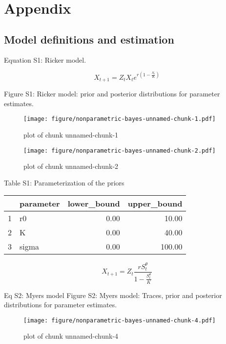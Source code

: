 \documentclass[author-year, review]{elsarticle} %
\makeatletter
\def\maxwidth{\ifdim\Gin@nat@width>\linewidth\linewidth
\else\Gin@nat@width\fi}
\let\Oldincludegraphics\includegraphics
\renewcommand{\includegraphics}[1]{\Oldincludegraphics[width=\maxwidth]{#1}}
\makeatother
\begin{document}
\section{Appendix}\label{appendix}

\subsection{Model definitions and
estimation}\label{model-definitions-and-estimation}

Equation S1: Ricker model.

\[X_{t+1} = Z_t X_t e^{r \left(1 - \frac{S_t}{K} \right) } \]

Figure S1: Ricker model: prior and posterior distributions for parameter
estimates.

\begin{figure}[htbp]
\centering
\texttt{[image: figure/nonparametric-bayes-unnamed-chunk-1.pdf]}
\caption{plot of chunk unnamed-chunk-1}
\end{figure}

\begin{figure}[htbp]
\centering
\texttt{[image: figure/nonparametric-bayes-unnamed-chunk-2.pdf]}
\caption{plot of chunk unnamed-chunk-2}
\end{figure}

Table S1: Parameterization of the priors

\begin{table}[ht]
\begin{center}
\begin{tabular}{rlrr}
  \hline
 & parameter & lower\_bound & upper\_bound \\ 
  \hline
1 & r0 & 0.00 & 10.00 \\ 
  2 & K & 0.00 & 40.00 \\ 
  3 & sigma & 0.00 & 100.00 \\ 
   \hline
\end{tabular}
\end{center}
\end{table}

\[ X_{t+1} = Z_t \frac{r S_t^{\theta}}{1 - \frac{S_t^\theta}{K}} \]

Eq S2: Myers model Figure S2: Myers model: Traces, prior and posterior
distributions for parameter estimates.

\begin{figure}[htbp]
\centering
\texttt{[image: figure/nonparametric-bayes-unnamed-chunk-4.pdf]}
\caption{plot of chunk unnamed-chunk-4}
\end{figure}
\end{document}
